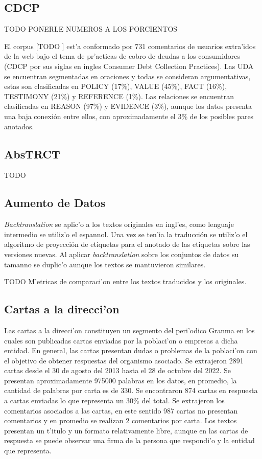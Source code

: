 \subsection{CDCP}\label{corpus:cdcp}

TODO PONERLE NUMEROS A LOS PORCIENTOS

El corpus [TODO \cite{CORPUS PAPER}] est'a conformado por 731 comentarios de usuarios extra'idos de la web bajo el tema de 
pr'acticas de cobro de deudas a los consumidores (CDCP por sus siglas en ingles Consumer Debt Collection Practices).
Las UDA se encuentran segmentadas en oraciones y todas se consideran argumentativas, estas son clasificadas en 
POLICY (17\%), VALUE (45\%), FACT (16\%), TESTIMONY (21\%) y REFERENCE (1\%). Las relaciones se encuentran 
clasificadas en REASON (97\%) y EVIDENCE (3\%), aunque los datos presenta una baja conexión entre ellos, con 
aproximadamente el 3\% de los posibles pares anotados.

\subsection{AbsTRCT}

TODO 

\subsection{Aumento de Datos}

\emph{Backtranslation} se aplic'o a los textos originales en ingl'es, como lenguaje intermedio se utiliz'o el espannol.
Una vez se ten'ia la traducción se utiliz'o el algoritmo de proyección de etiquetas para el anotado de las etiquetas sobre
las versiones nuevas.
Al aplicar \emph{backtranslation} sobre los conjuntos de datos su tamanno se duplic'o aunque los textos se mantuvieron
similares. 

TODO M'etricas de comparaci'on entre los textos traducidos y los originales.

\subsection{Cartas a la direcci'on}

Las cartas a la direcci'on constituyen un segmento del peri'odico Granma en los cuales son publicadas
cartas enviadas por la poblaci'on o empresas a dicha entidad. En general, las cartas 
presentan dudas o problemas de la poblaci'on con el objetivo de obtener respuestas del organismo
asociado. Se extrajeron 2891 cartas desde el 30 de agosto del 2013 hasta el 28 de octubre del 2022. Se 
presentan aproximadamente 975000 palabras en los datos, en promedio, la cantidad de palabras por carta es de 330.
Se encontraron 874 cartas en respuesta a cartas enviadas lo que representa un 30\% del total. Se extrajeron
los comentarios asociados a las cartas, en este sentido 987 cartas no presentan comentarios y en promedio 
se realizan 2 comentarios por carta. Los textos presentan un t'itulo y un formato relativamente libre, 
aunque en las cartas de respuesta se puede observar una firma de la persona que respondi'o y la entidad que 
representa.

